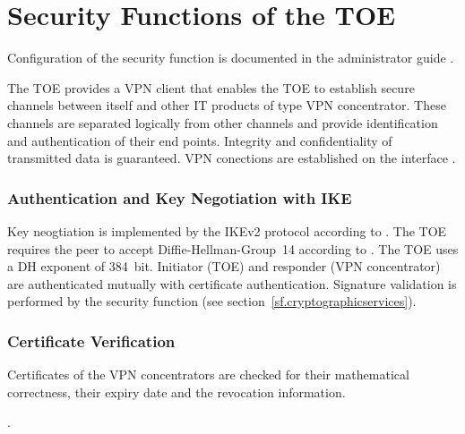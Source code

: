 \chapter{Security Functions of the TOE}\label{sf}



Configuration of the security function is documented in the administrator guide
\autocite[Section~7.4.3.3 VPN (Virtual Private Network)]{agd_adm}.

\sfdescription{}

The TOE provides a VPN client that enables the TOE to establish secure channels
between itself and other IT products of type VPN concentrator. These channels
are separated logically from other channels and provide identification and
authentication of their end points. Integrity and confidentiality of transmitted
data is guaranteed. VPN conections are established on the interface \lswan{}.
 
\subsection{Authentication and Key Negotiation with IKE}\label{sf.vpn.ike}

Key neogtiation is implemented by the IKEv2 protocol according to
. The TOE requires the peer to accept Diffie-Hellman-Group~14
according to . The TOE uses a DH exponent of 384~bit. Initiator
(TOE) and responder (VPN concentrator) are authenticated mutually with
certificate authentication. Signature validation is performed by the security
function 
(see section~\vref{sf.cryptographicservices}).


\subsection{Certificate Verification}\label{sf.vpn.certverification}

Certificates of the VPN concentrators are checked for their mathematical
correctness, their expiry date and the revocation
information.

.


